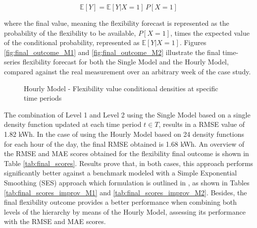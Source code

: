 \begin{equation}
  \mathbb{E}[Y] = \mathbb{E}[Y|X=1] \,  P[X=1]
\end{equation}

where the final value, meaning the flexibility forecast is represented as the probability of the flexibility to be available, $ P[X=1]$,  times the expected value of the conditional probability, represented as $\mathbb{E}[Y|X=1]$. Figures \ref{fig:final_outcome_M1} and \ref{fig:final_outcome_M2} illustrate the final time-series flexibility forecast for both the Single Model and the Hourly Model, compared against the real measurement over an arbitrary week of the case study.



\begin{figure}[htbp]
\centering    
{}
\caption{Hourly Model - Flexibility value conditional densities at specific time periods}
\label{fig:conditional_densities_2}
\end{figure}


The combination of Level 1 and Level 2 using the Single Model based on a single density function updated at each time period $t \in T$, results in a RMSE value of 1.82 kWh. In the case of using the Hourly Model based on 24 density functions for each hour of the day, the final RMSE obtained is 1.68 kWh. An overview of the RMSE and MAE scores obtained for the flexibility final outcome is shown in Table \ref{tab:final_scores}. Results prove that, in both cases, this approach performs significantly better against a benchmark modeled with a Simple Exponential Smoothing (SES) approach which formulation is outlined in \cite{Hyndman2021}, as shown in Tables \ref{tab:final_scores_improv_M1} and  \ref{tab:final_scores_improv_M2}. 
Besides, the final flexibility outcome provides a better performance when combining both levels of the hierarchy by means of the Hourly Model, assessing its performance with the RMSE and MAE scores. 

